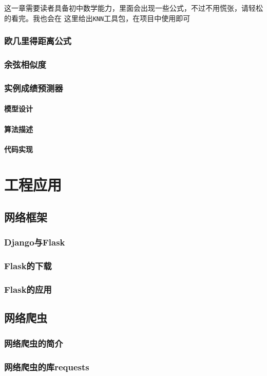 \documentclass{book}
\begin{document}
这一章需要读者具备初中数学能力，里面会出现一些公式，不过不用慌张，请轻松的看完。我也会在
这里给出\verb|KNN|工具包，在项目中使用即可
\section{欧几里得距离公式}
\section{余弦相似度}
\section{实例成绩预测器}
\subsection{模型设计}
\subsection{算法描述}
\subsection{代码实现}
\part{工程应用}
\chapter{网络框架}
\section{Django与Flask}
\section{Flask的下载}
\section{Flask的应用}
\chapter{网络爬虫}
\section{网络爬虫的简介}
\section{网络爬虫的库requests}
\end{document}
